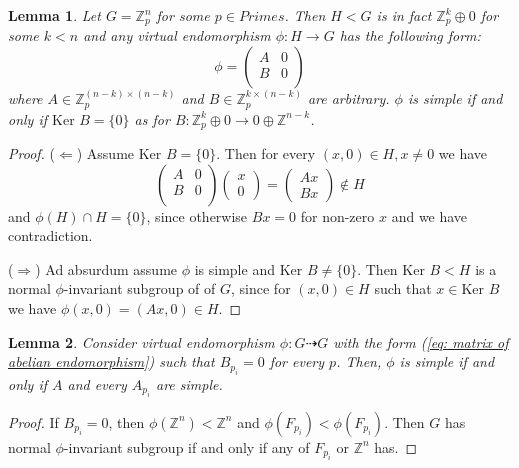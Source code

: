\documentclass[a4paper,12pt]{amsart}
\newtheorem{lemma}{Lemma}
\theoremstyle{definition}
\newcommand{\Ker}{\text{Ker }}
\begin{document}
	\begin{lemma}
		Let $G = \mathbb{Z}^n_p$ for some $p \in Primes$. Then $H < G$ is in fact $\mathbb{Z}^k_p \oplus 0$ for some $k < n$ and any virtual endomorphism $\phi : H \rightarrow G$ has the following form: 
		\begin{equation}
			\phi = 
			\begin{pmatrix}
				A & 0 \\ 
				B & 0 \\ 
			\end{pmatrix}
		\end{equation}
		where $A \in \mathbb{Z}^{(n-k)\times(n-k)}_p$ and $B \in \mathbb{Z}^{k \times (n - k)}_p$ are arbitrary. $\phi$ is simple if and only if $\Ker B = \{0\}$ as for $B : \mathbb{Z}^k_p \oplus 0 \rightarrow 0 \oplus \mathbb{Z}^{n-k}$. 
	\end{lemma}
	\begin{proof}
		($\Leftarrow$) Assume $\Ker B = \{0\}$. Then for every $(x, 0) \in H, x \ne 0$ we have 
		$$
		\begin{pmatrix}
			A & 0 \\ 
			B & 0 \\ 
		\end{pmatrix}
		\begin{pmatrix}
			x \\ 
			0
		\end{pmatrix}
		= 
		\begin{pmatrix}
			Ax \\ 
			Bx
		\end{pmatrix}
		\notin H
		$$
		and $\phi(H) \cap H = \{0\}$, since otherwise $Bx = 0$ for non-zero $x$ and we have contradiction. 
		
		($\Rightarrow$) Ad absurdum assume $\phi$ is simple and $\Ker B \ne \{0\}$. Then $\Ker B < H$ is a normal $\phi$-invariant subgroup of of $G$, since for $(x, 0) \in H$ such that $x \in \Ker B$ we have $\phi(x, 0) = (Ax, 0) \in H$.  
	\end{proof}
	
	\begin{lemma}
		Consider virtual endomorphism $\phi: G \dashrightarrow G$ with the form (\ref{eq: matrix of abelian endomorphism}) such that $B_{p_i} = 0$ for every $p$. Then, $\phi$ is simple if and only if $A$ and every $A_{p_i}$ are simple.
	\end{lemma}
	
	\begin{proof}
		 If $B_{p_i} = 0$, then  $\phi(\mathbb{Z}^n) < \mathbb{Z}^n$ and $\phi(F_{p_i}) < \phi(F_{p_i})$. Then $G$ has normal $\phi$-invariant subgroup if and only if any of $F_{p_i}$ or $\mathbb{Z}^n$ has.  
		
	\end{proof}
	
\end{document}
